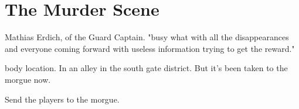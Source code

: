 \documentclass[a4paper]{dnd5}
\begin{document}
\section*{The Murder Scene}

\begin{precis}
\item Mathias Erdich, of the Guard  Captain.
    "busy what with all the disappearances and everyone coming forward with useless information trying to get the reward."
\item body location.  In an alley in the south gate district.  But it's been taken to the morgue now.
\end{precis}


\begin{outs} 
\item 
\item 
\end{outs}

\begin{purpose}
\item Send the players to the morgue.
\item 
\end{purpose}
     
\end{document}
